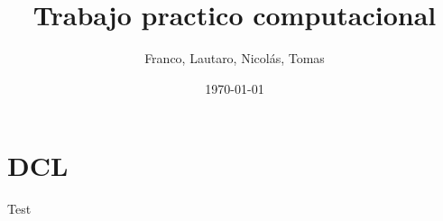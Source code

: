 \documentclass{article}
\title{Trabajo practico computacional}
\author{Franco, Lautaro, Nicol\'as, Tomas}
\date{\today}
\begin{document}
    \maketitle
    
    \section{DCL}
    
    Test
\end{document}

